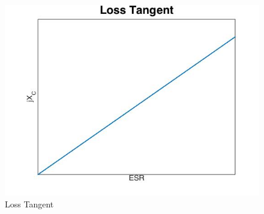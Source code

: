 \begin{figure}[ht!]
\includegraphics[keepaspectratio=true,width=6in]{./figures/parameters/lossTan.jpg}
\centering
\caption{Loss Tangent}
\label{fig:lossTan}
\end{figure}
